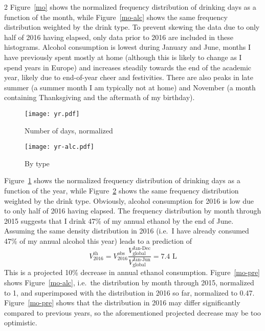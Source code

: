 \documentclass{article}
\newlength{\figwig}
\begin{document}
\begin{multicols}{2}
	Figure~\ref{mo} shows the normalized frequency distribution of drinking days as a function of the month, while Figure~\ref{mo-alc} shows the same frequency distribution weighted by the drink type. To prevent skewing the data due to only half of 2016 having elapsed, only data prior to 2016 are included in these histograms. Alcohol consumption is lowest during January and June, months I have previously spent mostly at home (although this is likely to change as I spend years in Europe) and increases steadily towards the end of the academic year, likely due to end-of-year cheer and festivities. There are also peaks in late summer (a summer month I am typically not at home) and November (a month containing Thanksgiving and the aftermath of my birthday).

	\begin{figure*}[!p]
		\centering
		\begin{subfigure}[b]{\figwig}
			\texttt{[image: yr.pdf]}
			\caption{Number of days, normalized}
			\label{yr}
		\end{subfigure}
		\begin{subfigure}[b]{\figwig}
			\texttt{[image: yr-alc.pdf]}
			\caption{By type}
			\label{yr-alc}
		\end{subfigure}
		\caption{Frequency distributions parameterized by year.}
	\end{figure*}

	Figure~\ref{yr} shows the normalized frequency distribution of drinking days as a function of the year, while Figure~\ref{yr-alc} shows the same frequency distribution weighted by the drink type. Obviously, alcohol consumption for 2016 is low due to only half of 2016 having elapsed. The frequency distribution by month through 2015 suggests that I drink 47\% of my annual ethanol by the end of June. Assuming the same density distribution in 2016 (i.e.\ I have already consumed 47\% of my annual alcohol this year) leads to a prediction of
	$$V_{2016}^\text{th} = V_{2016}^\text{obs}\frac{V_\text{global}^\text{Jan-Dec}}{V_\text{global}^\text{Jan-Jun}} = 7.4\text{ L}$$
	This is a projected 10\% decrease in annual ethanol consumption. Figure~\ref{mo-pre} shows Figure~\ref{mo-alc}, i.e.\ the distribution by month through 2015, normalized to 1, and superimposed with the distribution in 2016 so far, normalized to 0.47. Figure~\ref{mo-pre} shows that the distribution in 2016 may differ significantly compared to previous years, so the aforementioned projected decrease may be too optimistic.
	

\end{multicols}
\end{document}
